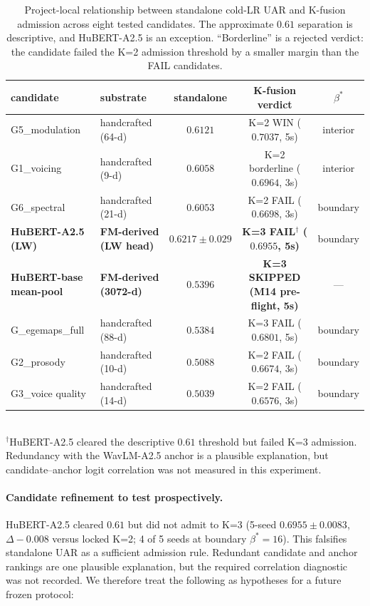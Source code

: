 \begin{table}[t]
\centering\small
\caption{Project-local relationship between standalone cold-LR UAR and K-fusion admission across eight tested candidates. The approximate $0.61$ separation is descriptive, and HuBERT-A2.5 is an exception. ``Borderline'' is a rejected verdict: the candidate failed the K=2 admission threshold by a smaller margin than the FAIL candidates.}
\label{tab:standalone_predictor}
\begin{tabular}{llccc}
\toprule
candidate         & substrate    & standalone & K-fusion verdict & $\beta^*$ \\
\midrule
G5\_modulation    & handcrafted (64-d)  & $0.6121$ & K=2 WIN ($0.7037$, 5s)         & interior \\
G1\_voicing       & handcrafted (9-d)   & $0.6058$ & K=2 borderline ($0.6964$, 3s)  & interior \\
G6\_spectral      & handcrafted (21-d)  & $0.6053$ & K=2 FAIL ($0.6698$, 3s)        & boundary \\
\textbf{HuBERT-A2.5 (LW)}      & \textbf{FM-derived (LW head)} & $\mathbf{0.6217 \pm 0.029}$ & \textbf{K=3 FAIL$^\dagger$ ($0.6955$, 5s)} & boundary \\
\textbf{HuBERT-base mean-pool} & \textbf{FM-derived (3072-d)} & $\mathbf{0.5396}$ & \textbf{K=3 SKIPPED (M14 pre-flight, 5s)} & --- \\
G\_egemaps\_full  & handcrafted (88-d)  & $0.5384$ & K=3 FAIL ($0.6801$, 5s)        & boundary \\
G2\_prosody       & handcrafted (10-d)  & $0.5088$ & K=2 FAIL ($0.6674$, 3s)        & boundary \\
G3\_voice quality & handcrafted (14-d)  & $0.5039$ & K=2 FAIL ($0.6576$, 3s)        & boundary \\
\bottomrule
\end{tabular}
\\[2pt]
\footnotesize{$^\dagger$HuBERT-A2.5 cleared the descriptive $0.61$ threshold but failed K=3 admission. Redundancy with the WavLM-A2.5 anchor is a plausible explanation, but candidate--anchor logit correlation was not measured in this experiment.}
\end{table}

\paragraph{Candidate refinement to test prospectively.} HuBERT-A2.5 cleared $0.61$ but did not admit to K=3 (5-seed $0.6955 \pm 0.0083$, $\Delta -0.008$ versus locked K=2; 4 of 5 seeds at boundary $\beta^*{=}16$). This falsifies standalone UAR as a sufficient admission rule. Redundant candidate and anchor rankings are one plausible explanation, but the required correlation diagnostic was not recorded. We therefore treat the following as hypotheses for a future frozen protocol:

